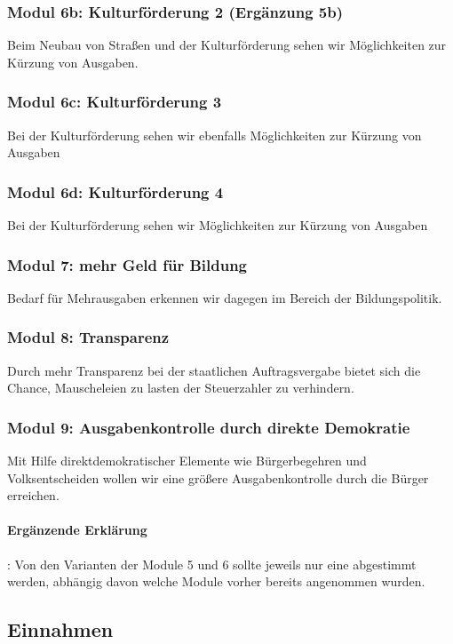 \subsubsection{Modul 6b: Kulturförderung 2 (Ergänzung 5b)}
\abstimmung
Beim Neubau von Straßen und der Kulturförderung sehen wir Möglichkeiten zur Kürzung von Ausgaben.

\subsubsection{Modul 6c: Kulturförderung 3}
\abstimmung
Bei der Kulturförderung sehen wir ebenfalls Möglichkeiten zur Kürzung von Ausgaben

\subsubsection{Modul 6d: Kulturförderung 4}
\abstimmung
Bei der Kulturförderung sehen wir Möglichkeiten zur Kürzung von Ausgaben

\subsubsection{Modul 7: mehr Geld für Bildung}
\abstimmung
Bedarf für Mehrausgaben erkennen wir dagegen im Bereich der Bildungspolitik.

\subsubsection{Modul 8: Transparenz}
\abstimmung
Durch mehr Transparenz bei der staatlichen Auftragsvergabe bietet sich die Chance, Mauscheleien zu lasten der Steuerzahler zu verhindern.

\subsubsection{Modul 9: Ausgabenkontrolle durch direkte Demokratie}
\abstimmung
Mit Hilfe direktdemokratischer Elemente wie Bürgerbegehren und Volksentscheiden wollen wir eine größere Ausgabenkontrolle durch die Bürger erreichen.
 
\paragraph{Ergänzende Erklärung}: Von den Varianten der Module 5 und 6 sollte jeweils nur eine abgestimmt werden, abhängig davon welche Module vorher bereits angenommen wurden.

\subsection*{Einnahmen}
\label{wp:finanzen:einnahme1}

